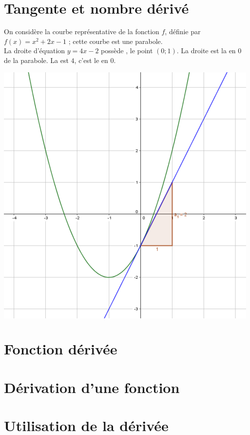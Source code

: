 \documentclass[12pt,a4paper]{article}
\date{}
\title{}
\begin{document}
	
	\section{Tangente et nombre dérivé}
	
	
	\begin{mydefs}
	\begin{multicols}{2}
		

	
	
	
	On considère la courbe représentative de la fonction $f$, définie par $f(x) = x^2 + 2x - 1$ ; cette courbe est une parabole.\\
	
	
	La droite d'équation $y = 4x - 2$ possède , le point $(0 ; 1)$. La droite est la  en 0 de la parabole.
	La  est $4$, c'est le  en 0. 
	
	\includegraphics[scale=0.5]{./img/ex}
	\end{multicols}
	\end{mydefs}
	
	\section{Fonction dérivée}
	
	\section{Dérivation d'une fonction}
	
	\section{Utilisation de la dérivée}
\end{document}
